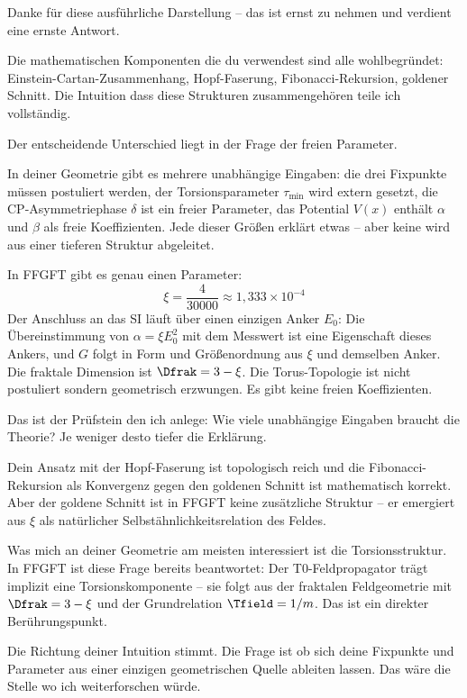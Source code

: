 \begin{response}
Danke für diese ausführliche Darstellung -- das ist ernst zu nehmen und verdient eine ernste Antwort.

Die mathematischen Komponenten die du verwendest sind alle wohlbegründet: Einstein-Cartan-Zusammenhang, Hopf-Faserung, Fibonacci-Rekursion, goldener Schnitt. Die Intuition dass diese Strukturen zusammengehören teile ich vollständig.

Der entscheidende Unterschied liegt in der Frage der freien Parameter.

In deiner Geometrie gibt es mehrere unabhängige Eingaben: die drei Fixpunkte müssen postuliert werden, der Torsionsparameter $\tau_{\min}$ wird extern gesetzt, die CP-Asymmetriephase $\delta$ ist ein freier Parameter, das Potential $V(x)$ enthält $\alpha$ und $\beta$ als freie Koeffizienten. Jede dieser Größen erklärt etwas -- aber keine wird aus einer tieferen Struktur abgeleitet.

In FFGFT gibt es genau einen Parameter:
\begin{equation}
  \xi = \frac{4}{30000} \approx 1{,}333 \times 10^{-4}
\end{equation}
Der Anschluss an das SI läuft über einen einzigen Anker $E_0$: Die Übereinstimmung von $\alpha = \xi E_0^2$ mit dem Messwert ist eine Eigenschaft dieses Ankers, und $G$ folgt in Form und Größenordnung aus $\xi$ und demselben Anker. Die fraktale Dimension ist $\Dfrak = 3 - \xi$. Die Torus-Topologie ist nicht postuliert sondern geometrisch erzwungen. Es gibt keine freien Koeffizienten.

\medskip
Das ist der Prüfstein den ich anlege: Wie viele unabhängige Eingaben braucht die Theorie? Je weniger desto tiefer die Erklärung.

\medskip
Dein Ansatz mit der Hopf-Faserung ist topologisch reich und die Fibonacci-Rekursion als Konvergenz gegen den goldenen Schnitt ist mathematisch korrekt. Aber der goldene Schnitt ist in FFGFT keine zusätzliche Struktur -- er emergiert aus $\xi$ als natürlicher Selbstähnlichkeitsrelation des Feldes.

\medskip
Was mich an deiner Geometrie am meisten interessiert ist die Torsionsstruktur. In FFGFT ist diese Frage bereits beantwortet: Der T0-Feldpropagator trägt implizit eine Torsionskomponente -- sie folgt aus der fraktalen Feldgeometrie mit $\Dfrak = 3 - \xi$ und der Grundrelation $\Tfield = 1/m$. Das ist ein direkter Berührungspunkt.

\medskip
Die Richtung deiner Intuition stimmt. Die Frage ist ob sich deine Fixpunkte und Parameter aus einer einzigen geometrischen Quelle ableiten lassen. Das wäre die Stelle wo ich weiterforschen würde.
\end{response}

